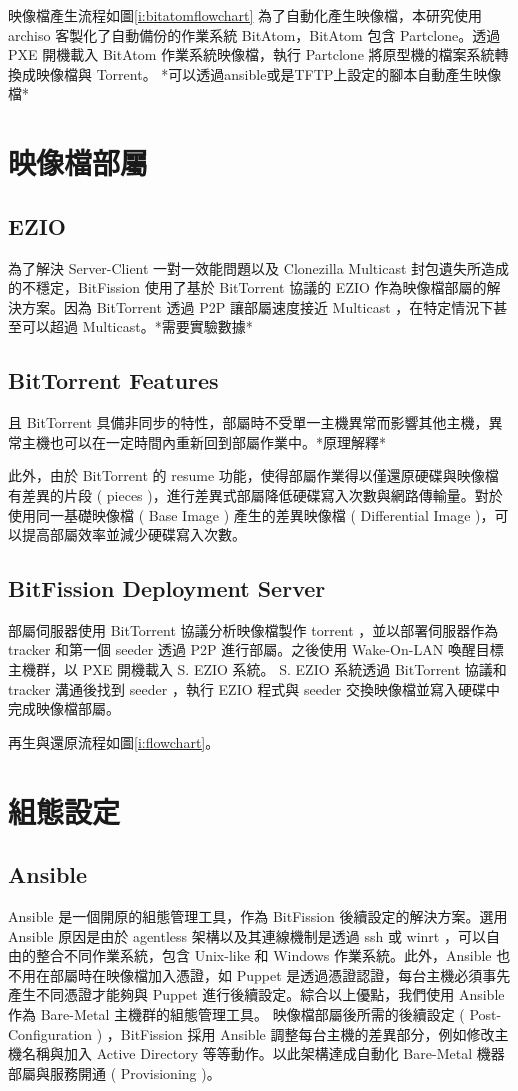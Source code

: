 映像檔產生流程如圖\ref{i:bitatomflowchart}
為了自動化產生映像檔，本研究使用 archiso 客製化了自動備份的作業系統 BitAtom，BitAtom 包含 Partclone。透過 PXE 開機載入 BitAtom 作業系統映像檔，執行 Partclone 將原型機的檔案系統轉換成映像檔與 Torrent。
*可以透過ansible或是TFTP上設定的腳本自動產生映像檔*


\section{映像檔部屬}
\subsection{EZIO}
為了解決 Server-Client 一對一效能問題以及 Clonezilla Multicast 封包遺失所造成的不穩定，BitFission 使用了基於 BitTorrent 協議的 EZIO 作為映像檔部屬的解決方案。因為 BitTorrent 透過 P2P 讓部屬速度接近 Multicast ，在特定情況下甚至可以超過 Multicast。*需要實驗數據*

\subsection{BitTorrent Features}
且 BitTorrent 具備非同步的特性，部屬時不受單一主機異常而影響其他主機，異常主機也可以在一定時間內重新回到部屬作業中。*原理解釋*


此外，由於 BitTorrent 的 resume 功能，使得部屬作業得以僅還原硬碟與映像檔有差異的片段 ( pieces )，進行差異式部屬降低硬碟寫入次數與網路傳輸量。對於使用同一基礎映像檔 ( Base Image ) 產生的差異映像檔 ( Differential Image )，可以提高部屬效率並減少硬碟寫入次數。

\subsection{BitFission Deployment Server}
部屬伺服器使用 BitTorrent 協議分析映像檔製作 torrent ，並以部署伺服器作為 tracker 和第一個 seeder 透過 P2P 進行部屬。之後使用 Wake-On-LAN 喚醒目標主機群，以 PXE 開機載入 S. EZIO 系統。 S. EZIO 系統透過 BitTorrent 協議和 tracker 溝通後找到 seeder ，執行 EZIO 程式與 seeder 交換映像檔並寫入硬碟中完成映像檔部屬。

再生與還原流程如圖\ref{i:flowchart}。





\section{組態設定}
\subsection{Ansible}
Ansible 是一個開原的組態管理工具，作為 BitFission 後續設定的解決方案。選用 Ansible 原因是由於 agentless 架構以及其連線機制是透過 ssh 或 winrt ，可以自由的整合不同作業系統，包含 Unix-like 和 Windows 作業系統。此外，Ansible 也不用在部屬時在映像檔加入憑證，如 Puppet 是透過憑證認證，每台主機必須事先產生不同憑證才能夠與 Puppet 進行後續設定。綜合以上優點，我們使用 Ansible 作為 Bare-Metal 主機群的組態管理工具。
映像檔部屬後所需的後續設定 ( Post-Configuration ) ，BitFission 採用 Ansible 調整每台主機的差異部分，例如修改主機名稱與加入 Active Directory 等等動作。以此架構達成自動化 Bare-Metal 機器部屬與服務開通 ( Provisioning )。
